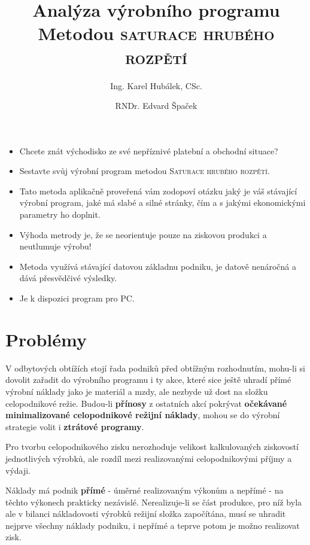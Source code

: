 \documentclass [10pt, fancyhdr, twoside] {article}
\begin{document}
\title{Analýza výrobního programu \\
  \large Metodou \textsc{saturace hrubého rozpětí} \\
}

\author{
  Ing. Karel Hubálek, CSc.
  \and
  RNDr. Edvard Špaček
}
\date{}

\maketitle




\begin{itemize}[label=\EightFlowerPetalRemoved]
\item Chcete znát východisko ze své nepříznivé platební a obchodní situace?
\item Sestavte svůj výrobní program metodou \textsc{Saturace hrubého rozpětí}.
\item Tato metoda aplikačně proveřená vám zodopoví otázku jaký je váš stávající výrobní program, jaké má slabé a silné stránky, čím a s jakými ekonomickými parametry ho doplnit.
\item Výhoda metrody je, že se neorientuje pouze na ziskovou produkci a neutlumuje výrobu!
\item Metoda využívá stávající datovou základnu podniku, je datově nenáročná a dává přesvědčivé výsledky.
\item Je k dispozici program pro PC.
\end{itemize}


\section{Problémy}

V odbytových obtížích stojí řada podniků před obtížným rozhodnutím, mohu-li si dovolit zařadit do výrobního programu i ty akce, které sice ještě uhradí přímé výrobní náklady jako je materiál a mzdy, ale nezbyde už dost na složku celopodnikové režie. Budou-li \textbf{přínosy} z ostatních akcí pokrývat \textbf{očekávané minimalizované celopodnikové režijní náklady}, mohou se do výrobní strategie volit i \textbf{ztrátové programy}.

Pro tvorbu celopodnikového zisku nerozhoduje velikost kalkulovaných ziskovostí jednotlivých výrobků, ale rozdíl mezi realizovanými celopodnikovými příjmy a výdaji.

Náklady má podnik \textbf{přímé} - úměrné realizovaným výkonům a nepřímé - na těchto výkonech prakticky nezávislé. Nerealizuje-li se část produkce, pro níž byla ale v bilanci nákladovosti výrobků režijní složka započítána, musí se uhradit nejprve všechny náklady podniku, i nepřímé a teprve potom je možno realizovat zisk.
\end{document}
